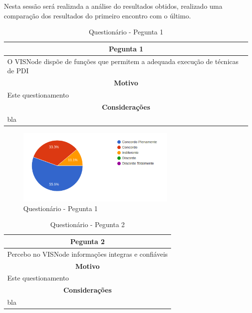\documentclass[
	12pt,				%
	oneside,			%
	a4paper,			%
	english,			%
	french,				%
	spanish,			%
	brazil,				%
	]{abntex2}
\begin{document}
Nesta sessão será realizada a análise do resultados obtidos, realizado uma comparação dos resultados do primeiro encontro com o último.

\begin{table}[H]
\centering
\caption{Questionário - Pegunta 1} 
\def\arraystretch{1.5}
\begin{tabular}{l}
\hline
\multicolumn{1}{c}{\textbf{Pegunta 1}}              \\ \hline
O VISNode dispõe de funções que permitem a adequada execução de técnicas de PDI \\ \hline
\multicolumn{1}{c}{\textbf{Motivo}}                 \\ \hline
Este questionamento                                   \\ \hline
\multicolumn{1}{c}{\textbf{Considerações}}          \\ \hline
bla                                                   \\ \hline
\end{tabular}
\sourceAuthor
\end{table}

\begin{figure}[H]
\centering
\caption{Questionário - Pegunta 1}
\includegraphics[width=0.7\textwidth]{imagens/v1/p1.png}
\sourceAuthor
\end{figure}

\begin{table}[H]
\centering
\caption{Questionário - Pegunta 2} 
\def\arraystretch{1.5}
\begin{tabular}{l}
\hline
\multicolumn{1}{c}{\textbf{Pegunta 2}}              \\ \hline
Percebo no VISNode informações integras e confiáveis \\ \hline
\multicolumn{1}{c}{\textbf{Motivo}}                 \\ \hline
Este questionamento                                   \\ \hline
\multicolumn{1}{c}{\textbf{Considerações}}          \\ \hline
bla                                                   \\ \hline
\end{tabular}
\sourceAuthor
\end{table}
\end{document}
